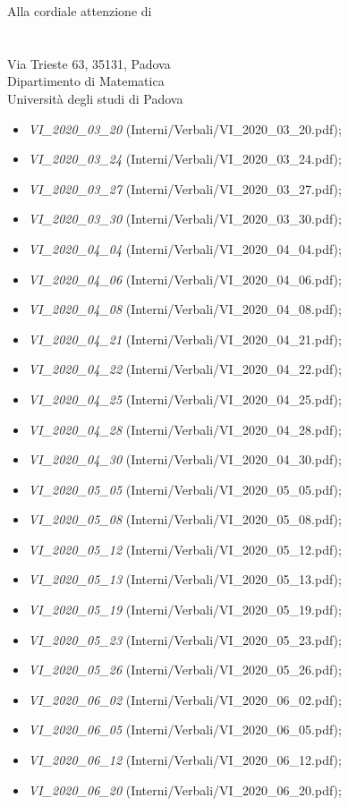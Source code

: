 \documentclass[a4paper]{letter}
\begin{document}
\begin{letter} {Alla cordiale attenzione di \\ \TV \\ \RC \\ Via Trieste 63, 35131, Padova\\ Dipartimento di Matematica \\ Università degli studi di Padova }
\begin{itemize}
\begin{itemize}
				\item \textit{VI\_2020\_03\_20} (Interni/Verbali/VI\_2020\_03\_20.pdf);
				\item \textit{VI\_2020\_03\_24} (Interni/Verbali/VI\_2020\_03\_24.pdf);
				\item \textit{VI\_2020\_03\_27} (Interni/Verbali/VI\_2020\_03\_27.pdf);
				\item \textit{VI\_2020\_03\_30} (Interni/Verbali/VI\_2020\_03\_30.pdf);
				\item \textit{VI\_2020\_04\_04} (Interni/Verbali/VI\_2020\_04\_04.pdf);
				\item \textit{VI\_2020\_04\_06} (Interni/Verbali/VI\_2020\_04\_06.pdf);
				\item \textit{VI\_2020\_04\_08} (Interni/Verbali/VI\_2020\_04\_08.pdf);
				\item \textit{VI\_2020\_04\_21} (Interni/Verbali/VI\_2020\_04\_21.pdf);
				\item \textit{VI\_2020\_04\_22} (Interni/Verbali/VI\_2020\_04\_22.pdf);
				\item \textit{VI\_2020\_04\_25} (Interni/Verbali/VI\_2020\_04\_25.pdf);
				\item \textit{VI\_2020\_04\_28} (Interni/Verbali/VI\_2020\_04\_28.pdf);
				\item \textit{VI\_2020\_04\_30} (Interni/Verbali/VI\_2020\_04\_30.pdf);
				\item \textit{VI\_2020\_05\_05} (Interni/Verbali/VI\_2020\_05\_05.pdf);
				\item \textit{VI\_2020\_05\_08} (Interni/Verbali/VI\_2020\_05\_08.pdf);
				\item \textit{VI\_2020\_05\_12} (Interni/Verbali/VI\_2020\_05\_12.pdf);
				\item \textit{VI\_2020\_05\_13} (Interni/Verbali/VI\_2020\_05\_13.pdf);
				\item \textit{VI\_2020\_05\_19} (Interni/Verbali/VI\_2020\_05\_19.pdf);
				\item \textit{VI\_2020\_05\_23} (Interni/Verbali/VI\_2020\_05\_23.pdf);
				\item \textit{VI\_2020\_05\_26} (Interni/Verbali/VI\_2020\_05\_26.pdf);
				\item \textit{VI\_2020\_06\_02} (Interni/Verbali/VI\_2020\_06\_02.pdf);
				\item \textit{VI\_2020\_06\_05} (Interni/Verbali/VI\_2020\_06\_05.pdf);
				\item \textit{VI\_2020\_06\_12} (Interni/Verbali/VI\_2020\_06\_12.pdf);
				\item \textit{VI\_2020\_06\_20} (Interni/Verbali/VI\_2020\_06\_20.pdf);

\end{itemize}
\end{itemize}
\end{letter}
\end{document}
